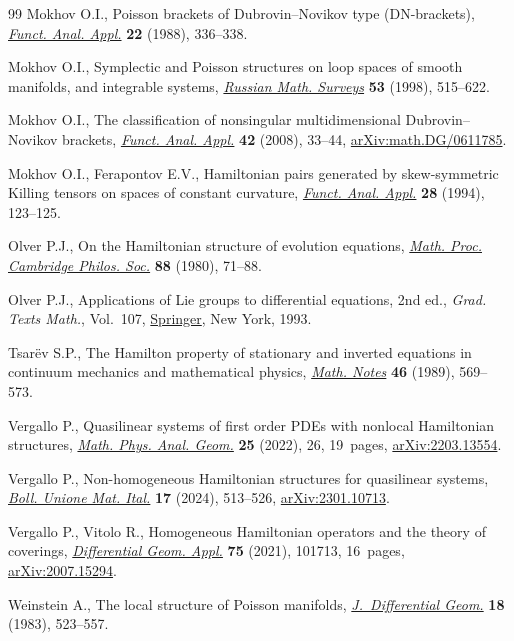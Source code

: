 \documentclass[10pt,a4paper]{amsart}
\numberwithin{equation}{section}
\begin{document}
\begin{thebibliography}{99}
Mokhov O.I., Poisson brackets of {D}ubrovin--{N}ovikov type ({DN}-brackets),
 \href{https://doi.org/10.1007/BF01077434}{\textit{Funct. Anal. Appl.}} \textbf{22} (1988), 336--338.

Mokhov O.I., Symplectic and {P}oisson structures on loop spaces of smooth
 manifolds, and integrable systems, \href{https://doi.org/10.1070/RM1998v053n03ABEH000019}{\textit{Russian Math. Surveys}} \textbf{53}
 (1998), 515--622.

Mokhov O.I., The classification of nonsingular multidimensional
 {D}ubrovin--{N}ovikov brackets, \href{https://doi.org/10.1007/s10688-008-0004-8}{\textit{Funct. Anal. Appl.}} \textbf{42}
 (2008), 33--44, \href{https://arxiv.org/abs/math.DG/0611785}{arXiv:math.DG/0611785}.

Mokhov O.I., Ferapontov E.V., Hamiltonian pairs generated by skew-symmetric
 {K}illing tensors on spaces of constant curvature, \href{https://doi.org/10.1007/BF01076502}{\textit{Funct. Anal.
 Appl.}} \textbf{28} (1994), 123--125.

Olver P.J., On the {H}amiltonian structure of evolution equations,
 \href{https://doi.org/10.1017/S0305004100057364}{\textit{Math. Proc. Cambridge Philos. Soc.}} \textbf{88} (1980), 71--88.

Olver P.J., Applications of {L}ie groups to differential equations, 2nd ed.,
 \textit{Grad. Texts Math.}, Vol.~107, \href{https://doi.org/10.1007/978-1-4612-4350-2}{Springer}, New York, 1993.

Tsar\"ev S.P., The {H}amilton property of stationary and inverted equations in
 continuum mechanics and mathematical physics, \href{https://doi.org/10.1007/BF01159109}{\textit{Math. Notes}}
 \textbf{46} (1989), 569--573.

Vergallo P., Quasilinear systems of first order {PDE}s with nonlocal
 {H}amiltonian structures, \href{https://doi.org/10.1007/s11040-022-09438-1}{\textit{Math. Phys. Anal. Geom.}} \textbf{25}
 (2022), 26, 19~pages, \href{https://arxiv.org/abs/2203.13554}{arXiv:2203.13554}.

Vergallo P., Non-homogeneous {H}amiltonian structures for quasilinear systems,
 \href{https://doi.org/10.1007/s40574-023-00369-5}{\textit{Boll. Unione Mat. Ital.}} \textbf{17} (2024), 513--526,
 \href{https://arxiv.org/abs/2301.10713}{arXiv:2301.10713}.

Vergallo P., Vitolo R., Homogeneous {H}amiltonian operators and the theory of
 coverings, \href{https://doi.org/10.1016/j.difgeo.2020.101713}{\textit{Differential Geom. Appl.}} \textbf{75} (2021), 101713,
 16~pages, \href{https://arxiv.org/abs/2007.15294}{arXiv:2007.15294}.

Weinstein A., The local structure of {P}oisson manifolds,
 \href{https://doi.org/10.4310/jdg/1214437787}{\textit{J.~Differential Geom.}} \textbf{18} (1983), 523--557.

\end{thebibliography}
\end{document}
